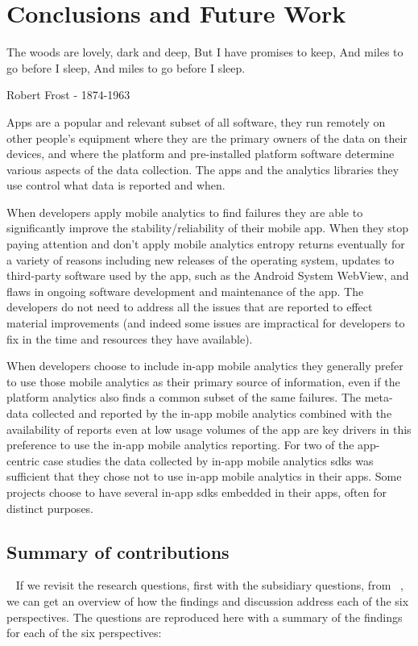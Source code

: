 \setchapterpreamble[u]{\margintoc}
\chapter{Conclusions and Future Work}\label{chapter-conclusions-and-future-work}

\epigraph{The woods are lovely, dark and deep,
But I have promises to keep,   
And miles to go before I sleep,   
And miles to go before I sleep.}{Robert Frost - 1874-1963}

Apps are a popular and relevant subset of all software, they run remotely on other people’s equipment where they are the primary owners of the data on their devices, and where the platform and pre-installed platform software determine various aspects of the data collection. The apps and the analytics libraries they use control what data is reported and when. 

When developers apply mobile analytics to find failures they are able to significantly improve the stability/reliability of their mobile app. When they stop paying attention and don't apply mobile analytics entropy returns eventually for a variety of reasons including new releases of the operating system, updates to third-party software used by the app, such as the Android System WebView, and flaws in ongoing software development and maintenance of the app. The developers do not need to address all the issues that are reported to effect material improvements (and indeed some issues are impractical for developers to fix in the time and resources they have available).

When developers choose to include in-app mobile analytics they generally prefer to use those mobile analytics as their primary source of information, even if the platform analytics also finds a common subset of the same failures. The meta-data collected and reported by the in-app mobile analytics combined with the availability of reports even at low usage volumes of the app are key drivers in this preference to use the in-app mobile analytics reporting. For two of the app-centric case studies the data collected by in-app mobile analytics \Glspl{sdk} was sufficient that they chose not to use in-app mobile analytics in their apps. Some projects choose to have several in-app \Glspl{sdk} embedded in their apps, often for distinct purposes.


\section{Summary of contributions}~\label{conclusions-summary-of-contributions}
If we revisit the research questions, first with the subsidiary questions, from ~, we can get an overview of how the findings and discussion address each of the six perspectives. The questions are reproduced here with a summary of the findings for each of the six perspectives: 

